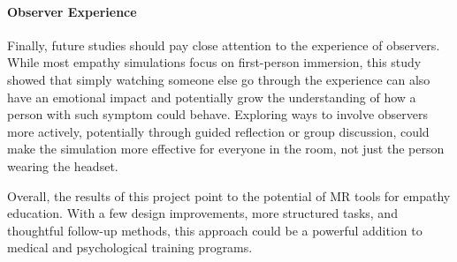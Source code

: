 \paragraph{Observer Experience} Finally, future studies should pay close attention to the experience of observers. While most empathy simulations focus on first-person immersion, this study showed that simply watching someone else go through the experience can also have an emotional impact and potentially grow the understanding of how a person with such symptom could behave. Exploring ways to involve observers more actively, potentially through guided reflection or group discussion, could make the simulation more effective for everyone in the room, not just the person wearing the headset.

\vspace{1em}

Overall, the results of this project point to the potential of MR tools for empathy education. With a few design improvements, more structured tasks, and thoughtful follow-up methods, this approach could be a powerful addition to medical and psychological training programs.